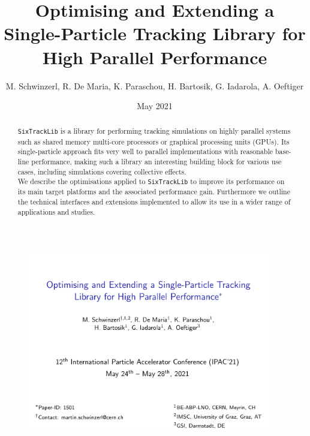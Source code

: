 \documentclass{beamer}
\title[SixTrackLib]{Optimising and Extending a Single-Particle Tracking Library for High Parallel Performance} %
\author[Schwinzerl et al]{M. Schwinzerl, R. De Maria, K. Paraschou, H. Bartosik, G. Iadarola, A. Oeftiger
\institute[CERN, GSI]{CERN, GSI} %
}
\date{May 2021} %
\begin{document}
\begin{frame}
\begin{figure}
 \centering
 \includegraphics[width=0.95\textwidth]{poster_images/fig_title}
\end{figure}
\end{frame}

\begin{frame}[t]
\begin{abstract}
\texttt{SixTrackLib} is a library for performing tracking simulations on highly parallel systems such as shared memory multi-core processors or
graphical processing units (GPUs). Its single-particle approach fits very well to parallel implementations with reasonable base-line performance,
making such a library an interesting building block for various use cases, including simulations covering collective effects.\\[0.4em]

\noindent We describe the optimisations applied to \texttt{SixTrackLib} to improve its performance on its main target platforms and the associated performance gain.
Furthermore we outline the technical interfaces and extensions implemented to allow its use in a wider range of applications and studies.
\end{abstract}
\end{frame}
\end{document}
